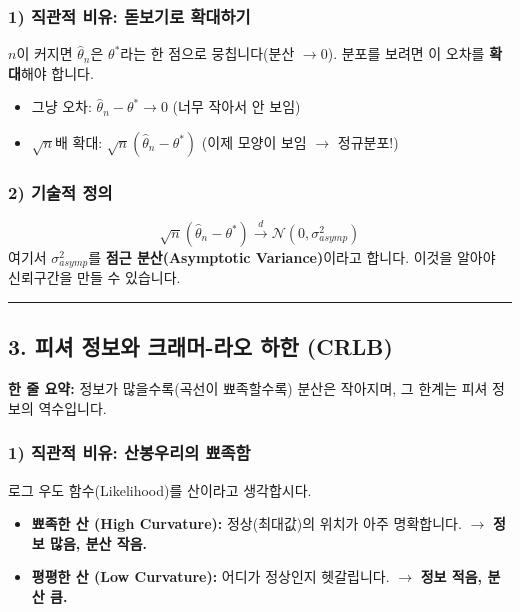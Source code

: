 \documentclass[11pt,a4paper]{book}
\theoremstyle{definition}
\begin{document}
\subsubsection*{1) 직관적 비유: 돋보기로 확대하기}
$n$이 커지면 $\hat{\theta}_n$은 $\theta^*$라는 한 점으로 뭉칩니다(분산 $\to 0$). 분포를 보려면 이 오차를 \textbf{확대}해야 합니다.
\begin{itemize}
    \item 그냥 오차: $\hat{\theta}_n - \theta^* \to 0$ (너무 작아서 안 보임)
    \item $\sqrt{n}$배 확대: $\sqrt{n}(\hat{\theta}_n - \theta^*)$ (이제 모양이 보임 $\to$ 정규분포!)
\end{itemize}

\subsubsection*{2) 기술적 정의}
$$ \sqrt{n}(\hat{\theta}_n - \theta^*) \xrightarrow{d} \mathcal{N}(0, \sigma^2_{asymp}) $$
여기서 $\sigma^2_{asymp}$를 \textbf{점근 분산(Asymptotic Variance)}이라고 합니다. 이것을 알아야 신뢰구간을 만들 수 있습니다.

\vspace{0.5cm}\hrule\vspace{0.5cm}

\subsection{3. 피셔 정보와 크래머-라오 하한 (CRLB)}


\begin{conceptbox}[title={개념 3: 추정 정밀도의 물리적 한계선}]
\textbf{한 줄 요약:} 정보가 많을수록(곡선이 뾰족할수록) 분산은 작아지며, 그 한계는 피셔 정보의 역수입니다.
\end{conceptbox}

\subsubsection*{1) 직관적 비유: 산봉우리의 뾰족함}
로그 우도 함수(Likelihood)를 산이라고 생각합시다.
\begin{itemize}
    \item \textbf{뾰족한 산 (High Curvature):} 정상(최대값)의 위치가 아주 명확합니다. $\to$ \textbf{정보 많음, 분산 작음.}
    \item \textbf{평평한 산 (Low Curvature):} 어디가 정상인지 헷갈립니다. $\to$ \textbf{정보 적음, 분산 큼.}
\end{itemize}
\end{document}
